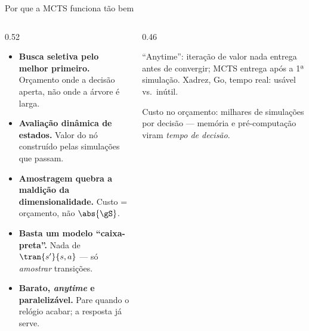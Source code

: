 \documentclass[aspectratio=169, 10pt]{beamer}
\begin{document}
\begin{frame}{Por que a MCTS funciona tão bem}
  \small
  \begin{columns}[T]
    \begin{column}{0.52\textwidth}
      \begin{itemize}\setlength{\itemsep}{0.4em}
        \item \textbf{Busca seletiva pelo melhor primeiro.} Orçamento onde a decisão aperta, não onde a árvore é larga.
        \item \textbf{Avaliação dinâmica de estados.} Valor do nó construído pelas simulações que passam.
        \item \textbf{Amostragem quebra a maldição da dimensionalidade.} Custo = orçamento, não $\abs{\gS}$.
        \item \textbf{Basta um modelo ``caixa-preta''.} Nada de $\tran{s'}{s,a}$ — só \emph{amostrar} transições.
        \item \textbf{Barato, \emph{anytime} e paralelizável.} Pare quando o relógio acabar; a resposta já serve.
      \end{itemize}
    \end{column}
    \begin{column}{0.46\textwidth}
      \begin{ideiabox}
        ``Anytime'': iteração de valor nada entrega antes de convergir; MCTS entrega após a 1ª simulação. Xadrez, Go, tempo real: usável vs.\ inútil.
      \end{ideiabox}
      \begin{alertabox}
        Custo no orçamento: milhares de simulações por decisão — memória e pré-computação viram \emph{tempo de decisão}.
      \end{alertabox}
    \end{column}
  \end{columns}
\end{frame}
\end{document}
